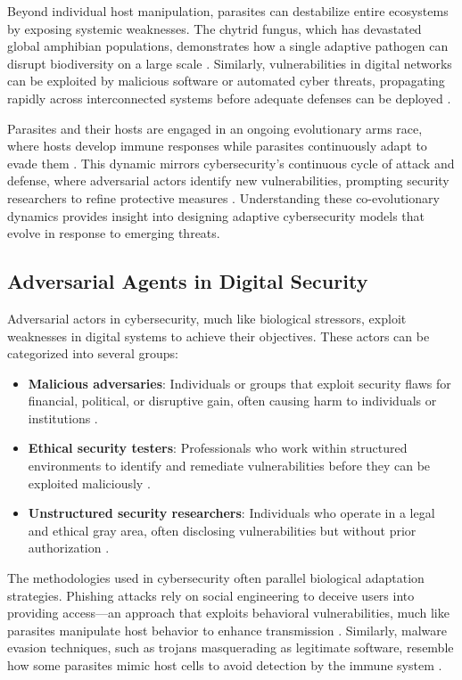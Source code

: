 \documentclass{article}
\begin{document}
Beyond individual host manipulation, parasites can destabilize entire ecosystems by exposing systemic weaknesses. The chytrid fungus, which has devastated global amphibian populations, demonstrates how a single adaptive pathogen can disrupt biodiversity on a large scale \citep{fisher2009emerging}. Similarly, vulnerabilities in digital networks can be exploited by malicious software or automated cyber threats, propagating rapidly across interconnected systems before adequate defenses can be deployed \citep{cisa2022supply}.

Parasites and their hosts are engaged in an ongoing evolutionary arms race, where hosts develop immune responses while parasites continuously adapt to evade them \citep{anderson1991infectious}. This dynamic mirrors cybersecurity’s continuous cycle of attack and defense, where adversarial actors identify new vulnerabilities, prompting security researchers to refine protective measures \citep{schneier2000secrets}. Understanding these co-evolutionary dynamics provides insight into designing adaptive cybersecurity models that evolve in response to emerging threats.

\subsection{Adversarial Agents in Digital Security}
Adversarial actors in cybersecurity, much like biological stressors, exploit weaknesses in digital systems to achieve their objectives. These actors can be categorized into several groups:
\begin{itemize}
    \item \textbf{Malicious adversaries}: Individuals or groups that exploit security flaws for financial, political, or disruptive gain, often causing harm to individuals or institutions \citep{mitnick2003art}.
    \item \textbf{Ethical security testers}: Professionals who work within structured environments to identify and remediate vulnerabilities before they can be exploited maliciously \citep{harris2020ethicalhacking}.
    \item \textbf{Unstructured security researchers}: Individuals who operate in a legal and ethical gray area, often disclosing vulnerabilities but without prior authorization \citep{holt2012hackers}.
\end{itemize}

The methodologies used in cybersecurity often parallel biological adaptation strategies. Phishing attacks rely on social engineering to deceive users into providing access—an approach that exploits behavioral vulnerabilities, much like parasites manipulate host behavior to enhance transmission \citep{ferguson2018socialengineering}. Similarly, malware evasion techniques, such as trojans masquerading as legitimate software, resemble how some parasites mimic host cells to avoid detection by the immune system \citep{biggio2018wild}.
\end{document}

